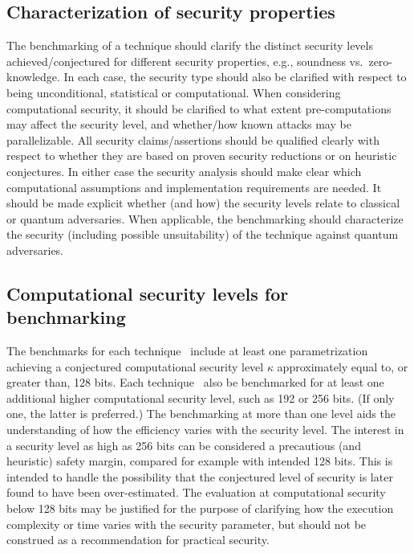 \def\tmpTitle{Characterization of security properties}
\subsection[\tmpTitle]{\tmpTitle{}}
\label{security:efficiency:characterize-properties}
	The benchmarking of a technique should clarify the distinct security levels achieved/conjectured for different security properties, e.g., soundness vs.\ zero-knowledge.
	In each case, the security type should also be clarified with respect to being unconditional, statistical or computational.
	When considering computational security, it should be clarified to what extent pre-computations may affect the security level, and whether/how known attacks may be parallelizable.
	All security claims/assertions should be qualified clearly with respect to whether they are based on proven security reductions or on heuristic conjectures. 
    In either case the security analysis should make clear which computational assumptions and implementation requirements are needed. 
    It should be made explicit whether (and how) the security levels relate to classical or quantum adversaries. 
    When applicable, the benchmarking should characterize the security (including possible unsuitability) of the technique against quantum adversaries.



\def\tmpTitle{Computational security levels for benchmarking}
\subsection[\tmpTitle]{\tmpTitle{}}
\label{security:efficiency:comp-sec-levels}

	The benchmarks for each technique \shall\ include at least one parametrization achieving a conjectured computational security level $\kappa$ approximately equal to, or greater than, 128 bits.
	Each technique \should\ also be benchmarked for at least one additional higher computational security level, such as 192 or 256 bits.
    (If only one, the latter is preferred.)
    The benchmarking at more than one level aids the understanding of how the efficiency varies with the security level.
    The interest in a security level as high as 256 bits can be considered a 
precautious (and heuristic) safety margin, compared for example with intended 128 bits.
    This is intended to handle the possibility that the conjectured level of security is later found to have been over-estimated.
	The evaluation at computational security below 128 bits may be justified for the purpose 
of clarifying how the execution complexity or time varies with the security parameter, 
but should not be construed as a recommendation for practical security.


